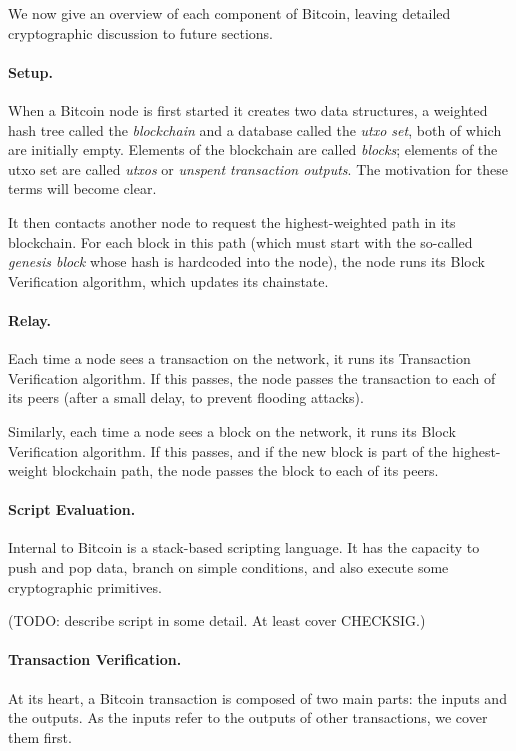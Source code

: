 \documentclass[letterpaper]{article}
\begin{document}
We now give an overview of each component of Bitcoin, leaving detailed
cryptographic discussion to future sections.

\paragraph{Setup.} When a Bitcoin node is first started it creates two
data structures, a weighted hash tree called the \emph{blockchain} and
a database called the \emph{utxo set}, both of which are initially empty.
Elements of the blockchain are called \emph{blocks}; elements of the
utxo set are called \emph{utxos} or \emph{unspent transaction outputs}.
The motivation for these terms will become clear.

It then contacts another node to request the highest-weighted path in
its blockchain. For each block in this path (which must start with the
so-called \emph{genesis block} whose hash is hardcoded into the node),
the node runs its Block Verification algorithm, which updates its
chainstate.

\paragraph{Relay.} Each time a node sees a transaction on the network,
it runs its Transaction Verification algorithm. If this passes, the
node passes the transaction to each of its peers (after a small delay,
to prevent flooding attacks).

Similarly, each time a node sees a block on the network, it runs its
Block Verification algorithm. If this passes, and if the new block is
part of the highest-weight blockchain path, the node passes the block
to each of its peers.

\paragraph{Script Evaluation.} Internal to Bitcoin is a stack-based
scripting language. It has the capacity to push and pop data, branch
on simple conditions, and also execute some cryptographic primitives.

(TODO: describe script in some detail. At least cover CHECKSIG.)


\paragraph{Transaction Verification.} At its heart, a Bitcoin transaction
is composed of two main parts: the inputs and the outputs. As the inputs
refer to the outputs of other transactions, we cover them first.
\end{document}
